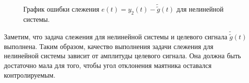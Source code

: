 \begin{figure}[!h]
	\caption{График ошибки слежения $e(t) = y_2(t)-\tilde{\tilde{g}}(t)$ для нелинейной системы.}
	\label{5_g_nonlin_another_e_an}
\end{figure}

Заметим, что задача слежения для нелинейной системы и целевого сигнала $\tilde{\tilde{g}}(t)$ выполнена. Таким образом, качество выполнения задачи слежения для нелинейной системы зависит от амплитуды целевого сигнала. Она должна быть достаточно мала для того, чтобы угол отклонения маятника оставался контролируемым.



\endinput